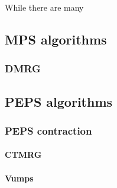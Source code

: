 
While there are many

\subsection{MPS algorithms}

\subsubsection{DMRG}

\subsection{PEPS algorithms}

\subsubsection{ PEPS contraction }

\paragraph{CTMRG}

\paragraph{Vumps}